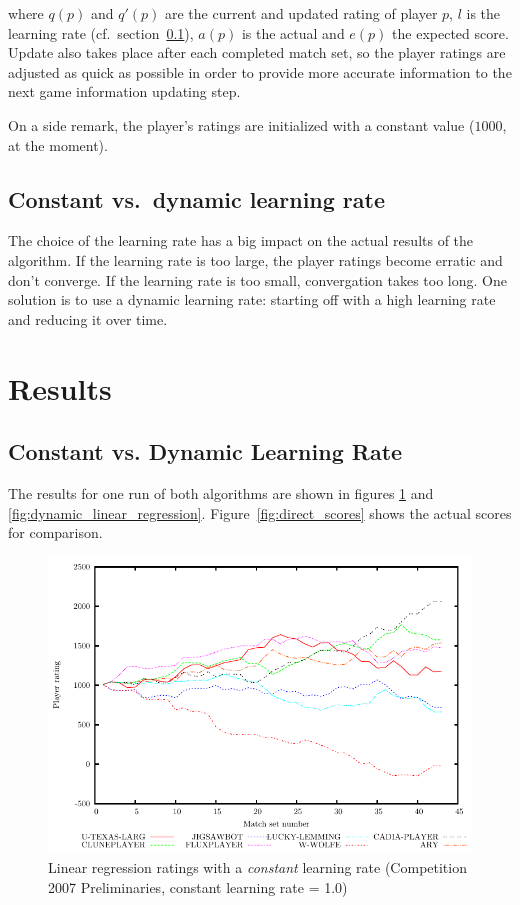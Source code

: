 \documentclass[a4paper,10pt]{article}
\begin{document}
where $q(p)$ and $q'(p)$ are the current and updated rating of player $p$, $l$ is the learning rate (cf.\ section~\ref{sec:constant_dynamic}), $a(p)$ is the actual and $e(p)$ the expected score. Update also takes place after each completed match set, so the player ratings are adjusted as quick as possible in order to provide more accurate information to the next game information updating step.

On a side remark, the player's ratings are initialized with a constant value ($1000$, at the moment).


\subsection{Constant vs.\ dynamic learning rate}
\label{sec:constant_dynamic}

The choice of the learning rate has a big impact on the actual results of the algorithm. If the learning rate is too large, the player ratings become erratic and don't converge. If the learning rate is too small, convergation takes too long. One solution is to use a dynamic learning rate: starting off with a high learning rate and reducing it over time.

\section{Results}

\subsection{Constant vs. Dynamic Learning Rate}
The results for one run of both algorithms are shown in figures \ref{fig:constant_linear_regression} and \ref{fig:dynamic_linear_regression}. Figure~\ref{fig:direct_scores} shows the actual scores for comparison.

\begin{figure}
 \centering
 \includegraphics[width=\textwidth]{constant_linear_regression_1_0}
 \caption{Linear regression ratings with a \textit{constant} learning rate (Competition 2007 Preliminaries, constant learning rate = 1.0)}
 \label{fig:constant_linear_regression}
\end{figure}
\end{document}
